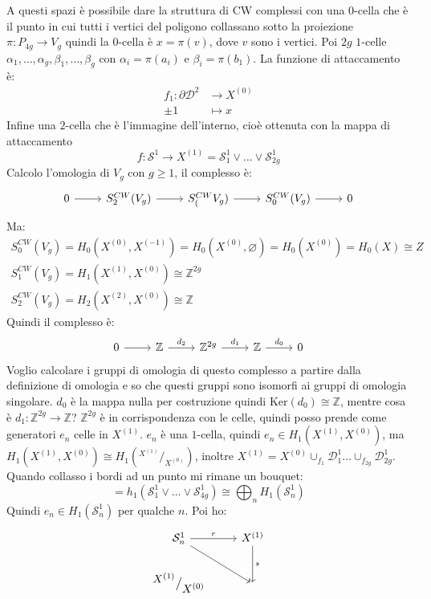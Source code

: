 \documentclass[10pt, twoside=false, x11names]{scrbook}
\newcommand{\Z}{\mathbb{Z}}
\renewcommand{\ker}[1]{\mathrm{Ker}( #1)}
\newcommand{\Sph}[1][]{\mathcal{S}^#1}
\newcommand{\Disk}[1][]{\mathcal{D}^#1}
\newcommand*\quot[2]{{^{\textstyle #1}\big/_{\textstyle #2}}}
\let\emptyset\varnothing
\begin{document}
A questi spazi è possibile dare la struttura di CW complessi
con una $ 0 $-cella che è il punto in cui tutti i vertici del
poligono collassano sotto la proiezione $ \pi \colon P_{4g} \to V_g $
quindi la $ 0 $-cella è $ x = \pi(v) $, dove $ v $ sono i vertici.
Poi $ 2 g $ $ 1 $-celle $ \alpha_1, \dots, \alpha_g, \beta_1, \dots, \beta_g $ con
$ \alpha_i = \pi(a_i) $ e $ \beta_i = \pi(b_1) $. La funzione di attaccamento
è:
\begin{align*}
  f_1 \colon \partial \Disk{2} & \to X^{(0)} \\
  \pm 1 & \mapsto x
\end{align*}
Infine una $ 2 $-cella
che è l'immagine dell'interno, cioè ottenuta con la mappa
di attaccamento
\[
  f \colon \Sph{1} \to X^{(1)} = \Sph{1}_1 \vee \dots \vee \Sph{1}_{2g}
\]
Calcolo l'omologia di $ V_g $ con $ g \geq 1 $, il complesso
è:
\[
  \begin{tikzcd}
    0 \rar & S^{CW}_2(V_g) \rar & S^{CW}_(V_g) \rar & S^{CW}_0(V_g) \rar & 0
  \end{tikzcd}
\]
Ma:
\begin{gather*}
  S^{CW}_0(V_g) = H_0(X^{(0)}, X^{(-1)}) = H_0(X^{(0)}, \emptyset) = H_0(X^{(0)}) = H_0(X) \cong Z \\
  S^{CW}_1(V_g) = H_1(X^{(1)}, X^{(0)}) \cong \Z^{2g} \\
  S^{CW}_2(V_g) = H_2(X^{(2)}, X^{(0)}) \cong \Z
\end{gather*}
Quindi il complesso è:
\[
  \begin{tikzcd}
    0 \rar & \Z \rar{d_2} & \Z^{2g} \rar{d_1} & \Z \rar{d_0} & 0
  \end{tikzcd}
\]
Voglio calcolare i gruppi di omologia di questo complesso a partire dalla
definizione di omologia e so che questi gruppi sono isomorfi ai gruppi di
omologia singolare. $ d_0 $ è la mappa nulla per costruzione quindi
$ \ker{d_0} \cong \Z $, mentre cosa è $ d_1 \colon \Z^{2g} \to \Z $? $ \Z^{2g} $ è in
corrispondenza con le celle, quindi posso prende come generatori $ e_n $ celle
in $ X^{(1)} $. $ e_n $ è una $ 1 $-cella, quindi
$ e_n \in H_1(X^{(1)}, X^{(0)}) $, ma
$ H_1(X^{(1)}, X^{(0)}) \cong H_1(\quot{X^{(1)}}{X^{(0)}}) $, inoltre
$ X^{(1)} = X^{(0)} \cup_{f_1} \Disk{1}_1 \dots \cup_{f_{2g}} \Disk{1}_{2g} $. Quando
collasso i bordi ad un punto mi rimane un bouquet:
\[
  = h_1(\Sph{1}_1 \vee \dots \vee \Sph{1}_{4g}) \cong \bigoplus_n H_1(\Sph{1}_n)
\]
Quindi $ e_n \in H_1(\Sph{1}_n) $ per qualche $ n $. Poi ho:
\[
  \begin{tikzcd}
    \Sph{1}_n \rar{r} \arrow{dr}{} & X^{(1)} \dar{s} \\
    \quot{X^{(1)}}{X^{(0)}} & {}
  \end{tikzcd}
\]
\end{document}
